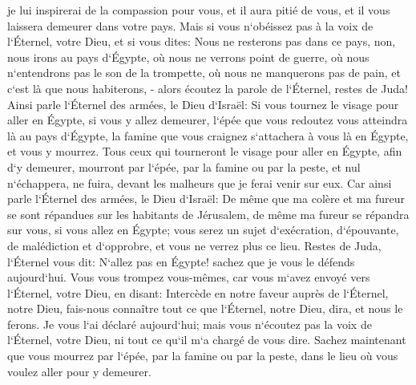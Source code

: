 \verse je lui inspirerai de la compassion pour vous, et il aura pitié de vous, et il vous laissera demeurer dans votre pays. 
\verse Mais si vous n`obéissez pas à la voix de l`Éternel, votre Dieu, 
\verse et si vous dites: Nous ne resterons pas dans ce pays, non, nous irons au pays d`Égypte, où nous ne verrons point de guerre, où nous n`entendrons pas le son de la trompette, où nous ne manquerons pas de pain, et c`est là que nous habiterons, - 
\verse alors écoutez la parole de l`Éternel, restes de Juda! Ainsi parle l`Éternel des armées, le Dieu d`Israël: Si vous tournez le visage pour aller en Égypte, si vous y allez demeurer, 
\verse l`épée que vous redoutez vous atteindra là au pays d`Égypte, la famine que vous craignez s`attachera à vous là en Égypte, et vous y mourrez. 
\verse Tous ceux qui tourneront le visage pour aller en Égypte, afin d`y demeurer, mourront par l`épée, par la famine ou par la peste, et nul n`échappera, ne fuira, devant les malheurs que je ferai venir sur eux. 
\verse Car ainsi parle l`Éternel des armées, le Dieu d`Israël: De même que ma colère et ma fureur se sont répandues sur les habitants de Jérusalem, de même ma fureur se répandra sur vous, si vous allez en Égypte; vous serez un sujet d`exécration, d`épouvante, de malédiction et d`opprobre, et vous ne verrez plus ce lieu. 
\verse Restes de Juda, l`Éternel vous dit: N`allez pas en Égypte! sachez que je vous le défends aujourd`hui. 
\verse Vous vous trompez vous-mêmes, car vous m`avez envoyé vers l`Éternel, votre Dieu, en disant: Intercède en notre faveur auprès de l`Éternel, notre Dieu, fais-nous connaître tout ce que l`Éternel, notre Dieu, dira, et nous le ferons. 
\verse Je vous l`ai déclaré aujourd`hui; mais vous n`écoutez pas la voix de l`Éternel, votre Dieu, ni tout ce qu`il m`a chargé de vous dire. 
\verse Sachez maintenant que vous mourrez par l`épée, par la famine ou par la peste, dans le lieu où vous voulez aller pour y demeurer. 

